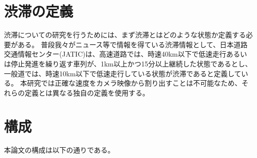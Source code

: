 \section{渋滞の定義}
渋滞についての研究を行うためには、まず渋滞とはどのような状態か定義する必要がある。
普段我々がニュース等で情報を得ている渋滞情報として、日本道路交通情報センター(JATIC)は、高速道路では、時速40km以下で低速走行あるいは停止発進を繰り返す車列が、1km以上かつ15分以上継続した状態であるとし、一般道では、時速10km以下で低速走行している状態が渋滞であると定義している。
本研究では正確な速度をカメラ映像から割り出すことは不可能なため、それらの定義とは異なる独自の定義を使用する。


\section{構成}
本論文の構成は以下の通りである。

